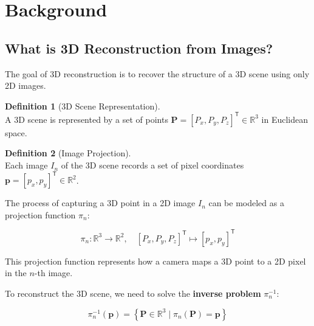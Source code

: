 \documentclass[12pt]{article}
\newcommand{\R}{\mathbb{R}}
\newcommand{\vect}[1]{\bm{#1}}
\theoremstyle{definition}
\newtheorem{definition}{Definition}[subsection]
\begin{document}
\tableofcontents 

\newpage
\section{Background} \label{sec:background}

\subsection{What is 3D Reconstruction from Images?} \label{sec:reconstruction_intro}

The goal of 3D reconstruction is to recover the structure of a 3D scene using only 2D images.

\begin{definition}[3D Scene Representation] \label{def:scene_repr} ~\\
A 3D scene is represented by a set of points $\vect{P} = [P_x, P_y, P_z]^\mathsf{T} \in \R^3$ in Euclidean space.
\end{definition}

\begin{definition}[Image Projection] \label{def:image_proj} ~\\
Each image $I_n$ of the 3D scene records a set of pixel coordinates $\vect{p} = [p_x, p_y]^\mathsf{T} \in \R^2$.
\end{definition}

The process of capturing a 3D point in a 2D image $I_n$ can be modeled as a projection function $\pi_n$:

\vspace{0.5em}
\begin{equation}
\boxed{\pi_n: \R^3 \to \R^2, \quad [P_x, P_y, P_z]^\mathsf{T} \mapsto [p_x, p_y]^\mathsf{T}} \label{eq:proj}
\end{equation}
\vspace{0.5em}

This projection function represents how a camera maps a 3D point to a 2D pixel in the $n$-th image.

To reconstruct the 3D scene, we need to solve the \textbf{inverse problem} $\pi_n^{-1}$:

\vspace{0.5em}
\begin{equation}
\boxed{\pi_n^{-1}(\vect{p}) = \left\{ \vect{P} \in \R^3 \mid \pi_n(\vect{P}) = \vect{p} \right\}} \label{eq:invproj}
\end{equation}
\vspace{0.5em}
\end{document}
